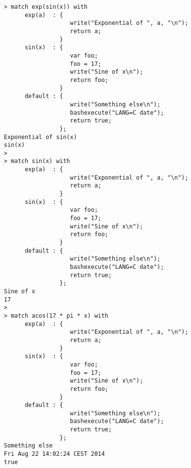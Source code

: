 \begin{center}\begin{minipage}{15cm}\begin{Verbatim}[frame=single]
> match exp(sin(x)) with
      exp(a)  : { 
                   write("Exponential of ", a, "\n");
                   return a;
                }
      sin(x)  : {
                   var foo;
                   foo = 17;
                   write("Sine of x\n");
                   return foo;
                }
      default : {
                   write("Something else\n");
                   bashexecute("LANG=C date");
                   return true;
                };
Exponential of sin(x)
sin(x)
> 
> match sin(x) with
      exp(a)  : { 
                   write("Exponential of ", a, "\n");
                   return a;
                }
      sin(x)  : {
                   var foo;
                   foo = 17;
                   write("Sine of x\n");
                   return foo;
                }
      default : {
                   write("Something else\n");
                   bashexecute("LANG=C date");
                   return true;
                };
Sine of x
17
> 
> match acos(17 * pi * x) with
      exp(a)  : { 
                   write("Exponential of ", a, "\n");
                   return a;
                }
      sin(x)  : {
                   var foo;
                   foo = 17;
                   write("Sine of x\n");
                   return foo;
                }
      default : {
                   write("Something else\n");
                   bashexecute("LANG=C date");
                   return true;
                };
Something else
Fri Aug 22 14:02:24 CEST 2014
true
\end{Verbatim}
\end{minipage}\end{center}
